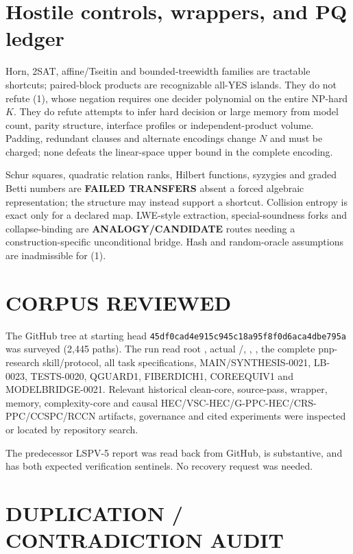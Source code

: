 \documentclass[11pt]{article}
\begin{document}
\section{Hostile controls, wrappers, and PQ ledger}

Horn, 2SAT, affine/Tseitin and bounded-treewidth families are tractable
shortcuts; paired-block products are recognizable all-YES islands.  They do
not refute (1), whose negation requires one decider polynomial on the entire
NP-hard $K$.  They do refute attempts to infer hard decision or large memory
from model count, parity structure, interface profiles or independent-product
volume.  Padding, redundant clauses and alternate encodings change $N$ and
must be charged; none defeats the linear-space upper bound in the complete
encoding.

Schur squares, quadratic relation ranks, Hilbert functions, syzygies and
graded Betti numbers are \textbf{FAILED TRANSFERS} absent a forced algebraic
representation; the structure may instead support a shortcut.  Collision
entropy is exact only for a declared map.  LWE-style extraction,
special-soundness forks and collapse-binding are \textbf{ANALOGY/CANDIDATE}
routes needing a construction-specific unconditional bridge.  Hash and
random-oracle assumptions are inadmissible for (1).

\section{CORPUS REVIEWED}

The GitHub tree at starting head
\texttt{45df0cad4e915c945c18a95f8f0d6aca4dbe795a} was surveyed (2,445 paths).
The run read root , actual /,
, , the complete pnp-research skill/protocol,
all task specifications, MAIN/SYNTHESIS-0021, LB-0023, TESTS-0020, QGUARD1,
FIBERDICH1, COREEQUIV1 and MODELBRIDGE-0021.  Relevant historical
clean-core, source-pass, wrapper, memory, complexity-core and causal
HEC/VSC-HEC/G-PPC-HEC/CRS-PPC/CCSPC/RCCN artifacts, governance and cited
experiments were inspected or located by repository search.

The predecessor LSPV-5 report
was read back from GitHub, is substantive, and has both expected verification
sentinels.  No recovery request was needed.

\section{DUPLICATION / CONTRADICTION AUDIT}
\end{document}
